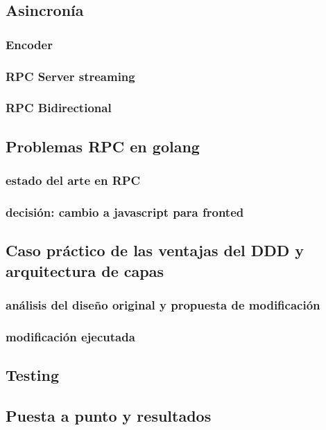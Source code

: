 \subsection{Asincronía}
    \subsubsection{Encoder}
    \subsubsection{RPC Server streaming}
    \subsubsection{RPC Bidirectional}
\subsection{Problemas RPC en golang}
    \subsubsection{estado del arte en RPC}
    \subsubsection{decisión: cambio a javascript para fronted}
\subsection{Caso práctico de las ventajas del DDD y arquitectura de capas}
    \subsubsection{análisis del diseño original y propuesta de modificación}
    \subsubsection{modificación ejecutada}
\subsection{Testing}
\subsection{Puesta a punto y resultados}